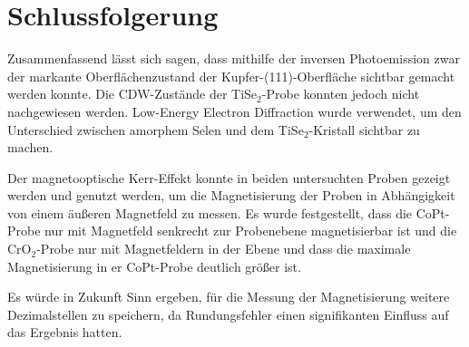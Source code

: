 \newpage
\section{Schlussfolgerung}

  Zusammenfassend lässt sich sagen, dass mithilfe der inversen Photoemission zwar der markante Oberflächenzustand der Kupfer-(111)-Oberfläche sichtbar gemacht werden konnte.
  Die CDW-Zustände der TiSe$_2$-Probe konnten jedoch nicht nachgewiesen werden.
  Low-Energy Electron Diffraction wurde verwendet, um den Unterschied zwischen amorphem Selen und dem TiSe$_2$-Kristall sichtbar zu machen.

  Der magnetooptische Kerr-Effekt konnte in beiden untersuchten Proben gezeigt werden und genutzt werden, um die Magnetisierung der Proben in Abhängigkeit von einem äußeren Magnetfeld zu messen.
  Es wurde festgestellt, dass die CoPt-Probe nur mit Magnetfeld senkrecht zur Probenebene magnetisierbar ist und die CrO$_2$-Probe nur mit Magnetfeldern in der Ebene und dass die maximale Magnetisierung in er CoPt-Probe deutlich größer ist.

  Es würde in Zukunft Sinn ergeben, für die Messung der Magnetisierung weitere Dezimalstellen zu speichern, da Rundungsfehler einen signifikanten Einfluss auf das Ergebnis hatten.
